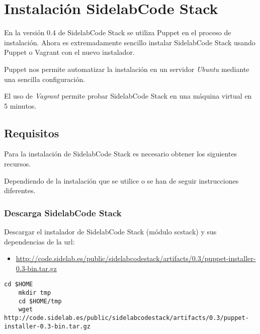 \chapter{Instalación SidelabCode Stack}
\label{app:instalacion-sidelab}

\par En la versión 0.4 de SidelabCode Stack se utiliza Puppet en el proceso de instalación. Ahora es extremadamente sencillo instalar SidelabCode Stack usando Puppet o Vagrant con el nuevo instalador.

\par Puppet nos permite automatizar la instalación en un servidor \emph{Ubuntu} mediante una sencilla configuración.

\par El uso de \emph{Vagrant} permite probar SidelabCode Stack en una máquina virtual en 5 minutos.

\section{Requisitos}
\label{sec:requisitos}

\par Para la instalación de SidelabCode Stack es necesario obtener los siguientes recursos.

\par Dependiendo de la instalación que se utilice  o  se han de seguir instrucciones diferentes.

\subsection{Descarga SidelabCode Stack}
\label{sub:descarga}

\par Descargar el instalador de SidelabCode Stack (módulo scstack) y sus dependencias de la url:

\begin{itemize}
	\item \url{http://code.sidelab.es/public/sidelabcodestack/artifacts/0.3/puppet-installer-0.3-bin.tar.gz}
\end{itemize}

\lstset{style=rubybasico}
\begin{lstlisting}[frame=trbl]
    cd $HOME
    mkdir tmp
    cd $HOME/tmp
    wget http://code.sidelab.es/public/sidelabcodestack/artifacts/0.3/puppet-installer-0.3-bin.tar.gz
\end{lstlisting}

